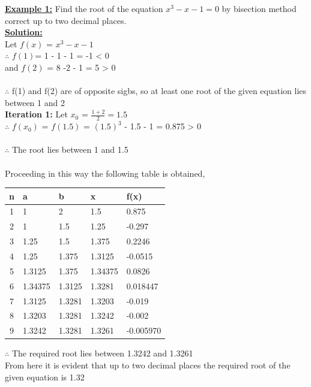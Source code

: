 \documentclass[12pt,a4paper]{article}
\begin{document}
	\textbf{\underline{Example 1:}} Find the root of the equation $x^3  - x -1 =0$ by bisection method correct up to two decimal places. \\
	
	\textbf{\underline{Solution:}}\\  Let \(f(x)\) = $x^3  - x -1$ \\
	$\therefore$ \(f(1)\)= 1 - 1 - 1 = -1 < 0 \\
	and \(f(2)\) = 8 -2 - 1 = 5 > 0 \\ \\
	$\therefore$ f(1) and f(2) are of opposite sigbs, so at least one root of the given equation lies between 1 and 2 \\
	
	\textbf{Iteration 1:} Let $x_0$ = $\frac{1+2}{2} = 1.5$ \\
	$\therefore$ \(f(x_0)\) = \(f(1.5)\) = $(1.5)^3$ - 1.5 - 1 = 0.875 > 0 \\ \\
	$\therefore$ The root lies between 1 and 1.5 \\ \\
	Proceeding in this way the following table is obtained,\\
	
	
	\begin{tabularx}{\textwidth}{|c|X|X|X|X|}
		\hline
		n & a & b & x & f(x) \\
		\hline
		1 & 1 & 2 & 1.5 & 0.875 \\
		\hline
		2 & 1 & 1.5 & 1.25 & -0.297 \\
		\hline
		3 & 1.25 & 1.5 & 1.375 & 0.2246 \\
		\hline
		4 & 1.25 & 1.375 & 1.3125 & -0.0515 \\
		\hline
		5 & 1.3125 & 1.375 & 1.34375 & 0.0826 \\
		\hline
		6 & 1.34375 & 1.3125 & 1.3281 & 0.018447 \\
		\hline
		7 & 1.3125 & 1.3281 & 1.3203 & -0.019 \\
		\hline
		8 & 1.3203 & 1.3281 & 1.3242 & -0.002 \\
		\hline
		9 & 1.3242 & 1.3281 & 1.3261 & -0.005970 \\
		\hline
	\end{tabularx}
	
	
	
	$\therefore$ The required root lies between 1.3242 and 1.3261 \vspace{0.5cm} \\
	From here it is evident that up to two decimal  places the required root of the given equation is 1.32 \\
	
\end{document}
